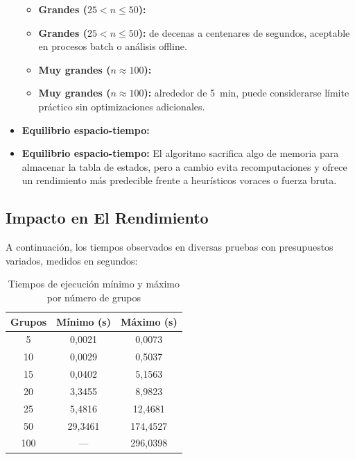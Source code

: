 \documentclass[11pt,letter]{article}
\begin{document}
\begin{itemize}
\begin{itemize}
          \item \textbf{Grandes ($25 < n \leq 50$):}

          \item \textbf{Grandes ($25 < n \leq 50$):}
          de decenas a centenares de segundos, aceptable en procesos batch o análisis offline.

          \item \textbf{Muy grandes ($n \approx 100$):}

          \item \textbf{Muy grandes ($n \approx 100$):}
          alrededor de 5~min, puede considerarse límite práctico sin optimizaciones adicionales.


        \end{itemize}


    \item \textbf{Equilibrio espacio-tiempo:}

    \item \textbf{Equilibrio espacio-tiempo:}
    El algoritmo sacrifica algo de memoria para almacenar la tabla de estados, pero a cambio evita recomputaciones y ofrece un rendimiento más predecible frente a heurísticos voraces o fuerza bruta.


    \end{itemize}


    \subsection{Impacto en El Rendimiento}
    A continuación, los tiempos observados en diversas pruebas con presupuestos variados, medidos en segundos:

        \begin{table}[h!]
    \centering
    \begin{tabular}{|c|c|c|}
    \hline
    \textbf{Grupos} & \textbf{Mínimo (s)} & \textbf{Máximo (s)} \\
    \hline
    5   & 0{,}0021 & 0{,}0073 \\
    10  & 0{,}0029 & 0{,}5037 \\
    15  & 0{,}0402 & 5{,}1563 \\
    20  & 3{,}3455 & 8{,}9823 \\
    25  & 5{,}4816 & 12{,}4681 \\
    50  & 29{,}3461 & 174{,}4527 \\
    100 & ---      & 296{,}0398 \\
    \hline
    \end{tabular}
    \caption{Tiempos de ejecución mínimo y máximo por número de grupos}
    \label{tab:tiempos-grupos}
        \end{table}
\end{document}
